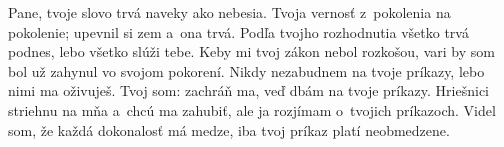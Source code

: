Pane, tvoje slovo
trvá naveky ako nebesia.
\versseparator
Tvoja vernosť z~pokolenia na pokolenie;
upevnil si zem a~ona trvá.
\versseparator
Podľa tvojho rozhodnutia všetko trvá podnes,
lebo všetko slúži tebe.
\versseparator
Keby mi tvoj zákon nebol rozkošou,
vari by som bol už zahynul vo svojom pokorení.
\versseparator
Nikdy nezabudnem na tvoje príkazy,
lebo nimi ma oživuješ.
\versseparator
Tvoj som: zachráň ma,
veď dbám na tvoje príkazy.
\versseparator
Hriešnici striehnu na mňa a~chcú ma zahubiť,
ale ja rozjímam o~tvojich príkazoch.
\versseparator
Videl som, že každá dokonalosť má medze,
iba tvoj príkaz platí neobmedzene.